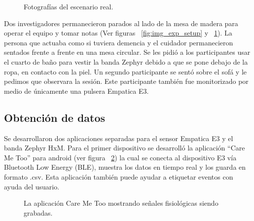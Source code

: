 \begin{figure}[h!]
        \centering
	\caption{Fotograf\'ias del escenario real.} \label{fig:img_exp_pics}
\end{figure}
Dos investigadores permanecieron parados al lado de la mesa de madera para operar el equipo y tomar notas (Ver figuras ~\ref{fig:img_exp_setup} y ~\ref{fig:img_exp_pics}). La persona que actuaba como si tuviera demencia y el cuidador permanecieron sentados frente a frente en una mesa circular. Se les pidi\'o a los participantes usar el cuarto de ba\~no para vestir la banda Zephyr debido a que se pone debajo de la ropa, en contacto con la piel. Un segundo participante se sent\'o sobre el sof\'a y le pedimos que observara la sesi\'on. Este participante tambi\'en fue monitorizado por medio de \'unicamente una pulsera Empatica E3.


\subsection{Obtenci\'on de datos}\label{secc:datagathering}
Se desarrollaron dos aplicaciones separadas para el sensor Empatica E3 y el banda Zephyr HxM. Para el primer dispositivo se desarroll\'o la aplicaci\'on ``Care Me Too'' para android (ver figura ~\ref{fig:caremetoo}) la cual se conecta al dispositivo E3 v\'ia Bluetooth Low Energy (BLE), muestra los datos en tiempo real y los guarda en formato .csv. Esta aplicaci\'on tambi\'en puede ayudar a etiquetar eventos con ayuda del usuario.


\begin{figure}[h]
        \centering
        \caption{La aplicaci\'on Care Me Too mostrando se\~nales fisiol\'ogicas siendo grabadas.}\label{fig:caremetoo}
\end{figure}

